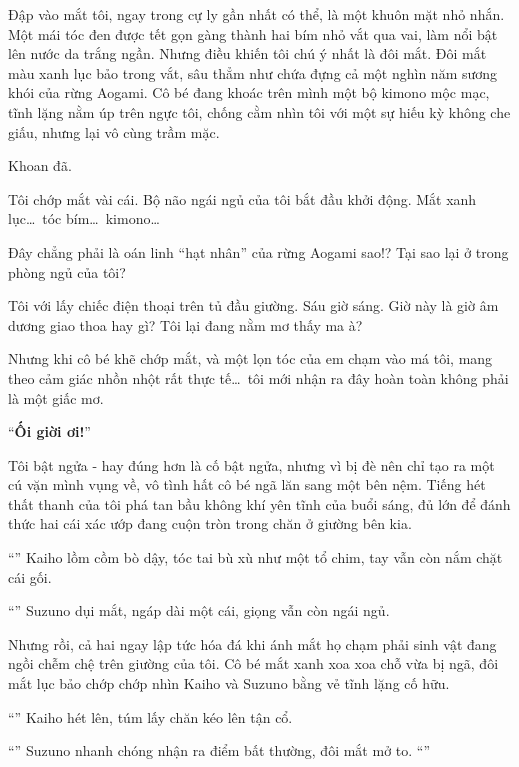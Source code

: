 \documentclass[../main.tex]{subfiles}
\begin{document}
Đập vào mắt tôi, ngay trong cự ly gần nhất có thể, là một khuôn mặt nhỏ nhắn. Một mái tóc đen được tết gọn gàng thành hai bím nhỏ vắt qua vai, làm nổi bật lên nước da trắng ngần. Nhưng điều khiến tôi chú ý nhất là đôi mắt. Đôi mắt màu xanh lục bảo trong vắt, sâu thẳm như chứa đựng cả một nghìn năm sương khói của rừng Aogami. Cô bé đang khoác trên mình một bộ kimono mộc mạc, tĩnh lặng nằm úp trên ngực tôi, chống cằm nhìn tôi với một sự hiếu kỳ không che giấu, nhưng lại vô cùng trầm mặc.

Khoan đã.

Tôi chớp mắt vài cái. Bộ não ngái ngủ của tôi bắt đầu khởi động. Mắt xanh lục\dots\ tóc bím\dots\ kimono\dots

Đây chẳng phải là oán linh ``hạt nhân'' của rừng Aogami sao!? Tại sao lại ở trong phòng ngủ của tôi?

Tôi với lấy chiếc điện thoại trên tủ đầu giường. Sáu giờ sáng. Giờ này là giờ âm dương giao thoa hay gì? Tôi lại đang nằm mơ thấy ma à?

Nhưng khi cô bé khẽ chớp mắt, và một lọn tóc của em chạm vào má tôi, mang theo cảm giác nhồn nhột rất thực tế\dots\ tôi mới nhận ra đây hoàn toàn không phải là một giấc mơ.

``{\Large\textbf{Ối giời ơi!}}''

Tôi bật ngửa - hay đúng hơn là cố bật ngửa, nhưng vì bị đè nên chỉ tạo ra một cú vặn mình vụng về, vô tình hất cô bé ngã lăn sang một bên nệm. Tiếng hét thất thanh của tôi phá tan bầu không khí yên tĩnh của buổi sáng, đủ lớn để đánh thức hai cái xác ướp đang cuộn tròn trong chăn ở giường bên kia.

``'' Kaiho lồm cồm bò dậy, tóc tai bù xù như một tổ chim, tay vẫn còn nắm chặt cái gối.

``'' Suzuno dụi mắt, ngáp dài một cái, giọng vẫn còn ngái ngủ.

Nhưng rồi, cả hai ngay lập tức hóa đá khi ánh mắt họ chạm phải sinh vật đang ngồi chễm chệ trên giường của tôi. Cô bé mắt xanh xoa xoa chỗ vừa bị ngã, đôi mắt lục bảo chớp chớp nhìn Kaiho và Suzuno bằng vẻ tĩnh lặng cố hữu.

``'' Kaiho hét lên, túm lấy chăn kéo lên tận cổ.

``'' Suzuno nhanh chóng nhận ra điểm bất thường, đôi mắt mở to. ``''
\end{document}
